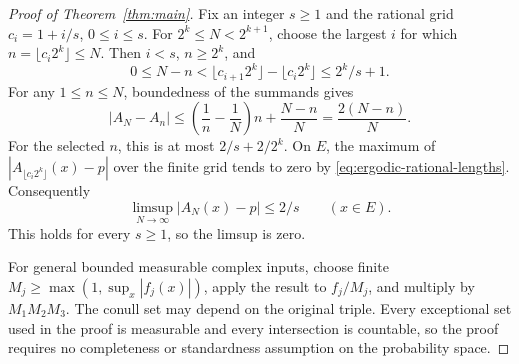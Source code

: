 \begin{proof}[Proof of Theorem~\ref{thm:main}]
Fix an integer \(s\geq1\) and the rational grid
\(c_i=1+i/s\), \(0\leq i\leq s\).  For \(2^k\leq N<2^{k+1}\), choose
the largest \(i\) for which \(n=\lfloor c_i2^k\rfloor\leq N\).
Then \(i<s\), \(n\geq2^k\), and
\[
 0\leq N-n
   <\lfloor c_{i+1}2^k\rfloor-\lfloor c_i2^k\rfloor
   \leq 2^k/s+1.
\]
For any \(1\leq n\leq N\), boundedness of the summands gives
\[
 |A_N-A_n|
 \leq\left(\frac1n-\frac1N\right)n+\frac{N-n}{N}
 =\frac{2(N-n)}{N}.
\]
For the selected \(n\), this is at most \(2/s+2/2^k\).
On \(E\), the maximum of
\(|A_{\lfloor c_i2^k\rfloor}(x)-p|\) over the finite grid tends to zero
by \eqref{eq:ergodic-rational-lengths}.  Consequently
\[
 \limsup_{N\to\infty}|A_N(x)-p|\leq2/s\qquad(x\in E).
\]
This holds for every \(s\geq1\), so the limsup is zero.

For general bounded measurable complex inputs, choose finite
\(M_j\geq\max(1,\sup_x|f_j(x)|)\), apply the result to \(f_j/M_j\), and
multiply by \(M_1M_2M_3\).  The conull set may depend on the original
triple.  Every exceptional set used in the proof is measurable and every
intersection is countable, so the proof requires no completeness or
standardness assumption on the probability space.
\end{proof}
